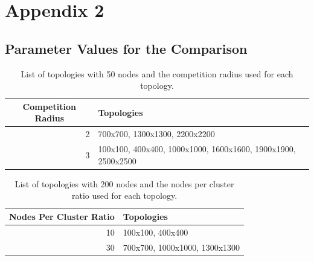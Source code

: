 \chapter{Appendix 2}
\section{Parameter Values for the \atwo{} Comparison}
\label{app:parameter-values-for-the-atwo-comparison}
\begin{table}[H]
\centering
\caption{List of topologies with 50 nodes and the competition radius used for each topology.}
\label{tab:50-nodes-competition-radius-value}
\begin{tabular}{|r|l|l|l|l|}
\hline
\multicolumn{1}{|c|}{\textbf{Competition Radius}} & \multicolumn{4}{l|}{\textbf{Topologies}}                        \\ \hline
2                                                 & \multicolumn{4}{l|}{700x700, 1300x1300, 2200x2200}              \\ \hline
3                                                 & \multicolumn{4}{l|}{100x100, 400x400, 1000x1000, 1600x1600, 1900x1900, 2500x2500} \\ \hline
\end{tabular}
\end{table}

\begin{table}[H]
\centering
\caption{List of topologies with 200 nodes and the nodes per cluster ratio used for each topology.}
\label{tab:50-nodes-nodes-per-cluster-ratio-value}
\begin{tabular}{|r|l|}
\hline
\textbf{Nodes Per Cluster Ratio} & \textbf{Topologies}           \\ \hline
10                               & 100x100, 400x400              \\ \hline
30                               & 700x700, 1000x1000, 1300x1300 \\ \hline
\end{tabular}
\end{table}

%
%